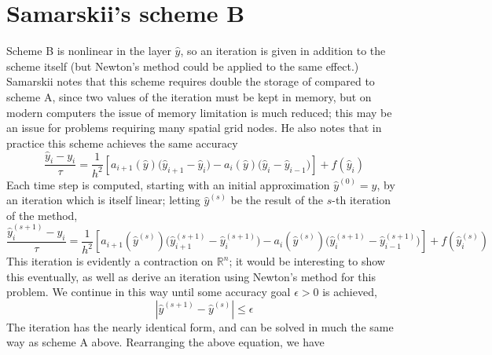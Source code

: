 \documentclass[12pt, reqno]{amsart}
\newcommand{\field}[1]{\mathbb{#1}}
\newcommand{\R}{\field{R}}
\newcommand{\Rn}{\R^{n}}
\begin{document}
\section{Samarskii's scheme B}
Scheme B is nonlinear in the layer $\hat{y}$, so an iteration is given in
addition to the scheme itself (but Newton's method could be applied to the same
effect.)
Samarskii notes that this scheme requires double the storage of compared to scheme A, since two values of the iteration must be kept in memory, but on modern computers the issue of memory limitation is much reduced; this may be an issue for problems requiring many spatial grid nodes.
He also notes that in practice this scheme achieves the same accuracy
\begin{equation}
  \frac{\hat{y}_{i}-y_{i}}{\tau}=\frac{1}{h^{2}}\left[a_{i+1}(\hat{y})\big( \hat{y}_{i+1}-\hat{y}_{i}\big) - a_{i}(\hat{y})\big(\hat{y}_{i}-\hat{y}_{i-1}\big) \right] + f(\hat{y}_{i})\label{eq:scheme-b}
\end{equation}
Each time step is computed, starting with an initial approximation $\hat{y}^{(0)}=y$, by an iteration which is itself linear; letting $\hat{y}^{(s)}$ be the result of the $s$-th iteration of the method,
\begin{equation}
  \frac{\hat{y}^{(s+1)}_{i}-y_{i}}{\tau}=\frac{1}{h^{2}}\left[a_{i+1}(\hat{y}^{(s)})\big( \hat{y}^{(s+1)}_{i+1}-\hat{y}^{(s+1)}_{i}\big) - a_{i}(\hat{y}^{(s)})\big(\hat{y}^{(s+1)}_{i}-\hat{y}^{(s+1)}_{i-1}\big) \right] + f(\hat{y}^{(s)}_{i})\label{eq:scheme-b-iter}
\end{equation}
This iteration is evidently a contraction on $\Rn$; it would be interesting to show this eventually, as well as derive an iteration using Newton's method for this problem.
We continue in this way until some accuracy goal $\epsilon>0$ is achieved,
\[ \left|\hat{y}^{(s+1)}-\hat{y}^{(s)} \right| \leq \epsilon\]
The iteration has the nearly identical form, and can be solved in much the same way as scheme A above.
Rearranging the above equation, we have
\end{document}
